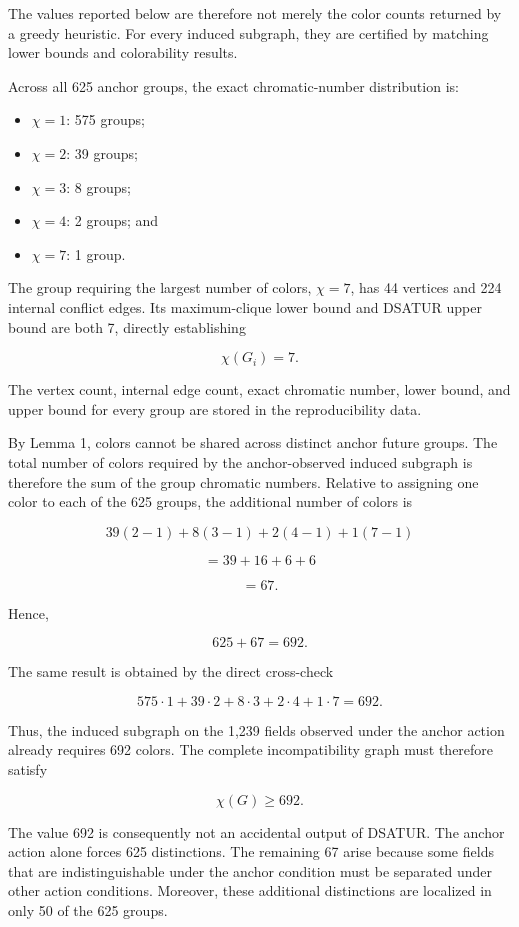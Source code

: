 \documentclass[
  11pt,
]{article}
\providecommand{\tightlist}{%
  \setlength{\itemsep}{0pt}\setlength{\parskip}{0pt}}
\begin{document}
The values reported below are therefore not merely the color counts
returned by a greedy heuristic. For every induced subgraph, they are
certified by matching lower bounds and colorability results.

Across all 625 anchor groups, the exact chromatic-number distribution
is:

\begin{itemize}
\tightlist
\item
  \({\chi=1}\): 575 groups;
\item
  \({\chi=2}\): 39 groups;
\item
  \({\chi=3}\): 8 groups;
\item
  \({\chi=4}\): 2 groups; and
\item
  \({\chi=7}\): 1 group.
\end{itemize}

The group requiring the largest number of colors, \({\chi=7}\), has 44
vertices and 224 internal conflict edges. Its maximum-clique lower bound
and DSATUR upper bound are both 7, directly establishing

\[{\chi(G_i)=7.}\]

The vertex count, internal edge count, exact chromatic number, lower
bound, and upper bound for every group are stored in the reproducibility
data.

By Lemma 1, colors cannot be shared across distinct anchor future
groups. The total number of colors required by the anchor-observed
induced subgraph is therefore the sum of the group chromatic numbers.
Relative to assigning one color to each of the 625 groups, the
additional number of colors is

\[{39(2-1)+8(3-1)+2(4-1)+1(7-1)}\]

\[{=39+16+6+6}\]

\[{=67.}\]

Hence,

\[{625+67=692.}\]

The same result is obtained by the direct cross-check

\[{575\cdot1+39\cdot2+8\cdot3+2\cdot4+1\cdot7=692.}\]

Thus, the induced subgraph on the 1,239 fields observed under the anchor
action already requires 692 colors. The complete incompatibility graph
must therefore satisfy

\[{\boxed{\chi(G)\ge692}.}\]

The value 692 is consequently not an accidental output of DSATUR. The
anchor action alone forces 625 distinctions. The remaining 67 arise
because some fields that are indistinguishable under the anchor
condition must be separated under other action conditions. Moreover,
these additional distinctions are localized in only 50 of the 625
groups.
\end{document}
